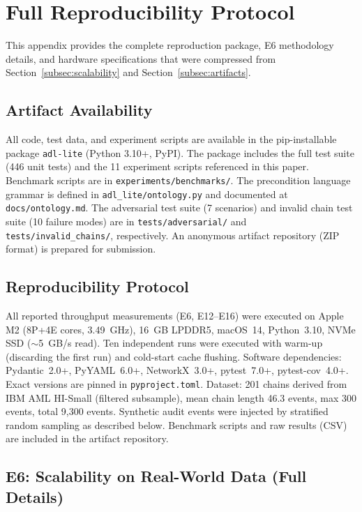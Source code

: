 \section{Full Reproducibility Protocol}\label{app:reproducibility}

This appendix provides the complete reproduction package, E6 methodology details, and hardware specifications that were compressed from Section~\ref{subsec:scalability} and Section~\ref{subsec:artifacts}.

\subsection{Artifact Availability}

All code, test data, and experiment scripts are available in the pip-installable package \texttt{adl-lite} (Python 3.10+, PyPI). The package includes the full test suite (446 unit tests) and the 11 experiment scripts referenced in this paper. Benchmark scripts are in \texttt{experiments/benchmarks/}. The precondition language grammar is defined in \texttt{adl\_lite/ontology.py} and documented at \texttt{docs/ontology.md}. The adversarial test suite (7 scenarios) and invalid chain test suite (10 failure modes) are in \texttt{tests/adversarial/} and \texttt{tests/invalid\_chains/}, respectively. An anonymous artifact repository (ZIP format) is prepared for submission.

\subsection{Reproducibility Protocol}

All reported throughput measurements (E6, E12--E16) were executed on Apple M2 (8P+4E cores, 3.49~GHz), 16~GB LPDDR5, macOS~14, Python~3.10, NVMe SSD ($\sim$5~GB/s read). Ten independent runs were executed with warm-up (discarding the first run) and cold-start cache flushing. Software dependencies: Pydantic~2.0+, PyYAML~6.0+, NetworkX~3.0+, pytest~7.0+, pytest-cov~4.0+. Exact versions are pinned in \texttt{pyproject.toml}. Dataset: 201 chains derived from IBM AML HI-Small (filtered subsample), mean chain length 46.3 events, max 300 events, total 9,300 events. Synthetic audit events were injected by stratified random sampling as described below. Benchmark scripts and raw results (CSV) are included in the artifact repository.

\subsection{E6: Scalability on Real-World Data (Full Details)}

